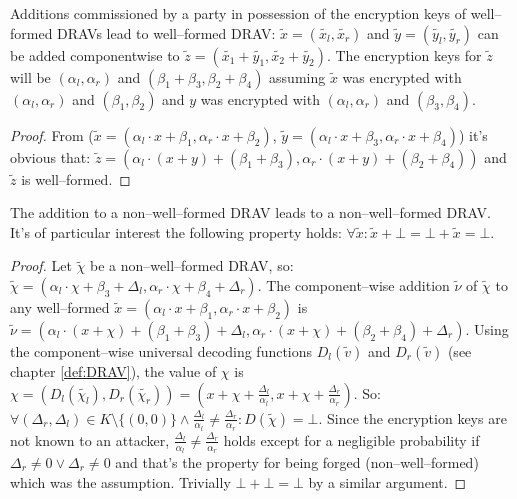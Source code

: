 \begin{lem}
  \label{lem:DRAV-add}

Additions commissioned by a party in possession of the encryption keys of
well--formed DRAVs lead to well--formed DRAV: $\widetilde{x} =
(\widetilde{x_l}, \widetilde{x_r})$ and $\widetilde{y} = (\widetilde{y_l},
\widetilde{y_r})$ can be added componentwise to $\widetilde{z} =
\left(\widetilde{x_1} + \widetilde{y_1}, \widetilde{x_2} +
\widetilde{y_2}\right)$. The encryption keys for $\widetilde{z}$ will be
$(\alpha_l, \alpha_r)$ and $(\beta_1 + \beta_3, \beta_2 + \beta_4)$ assuming
$\widetilde{x}$ was encrypted with $(\alpha_l, \alpha_r)$ and $(\beta_1,
\beta_2)$ and $y$ was encrypted with $(\alpha_l, \alpha_r)$ and $(\beta_3,
\beta_4)$.

\end{lem}
\begin{proof}

From ($\widetilde{x} = \left(\alpha_l \cdot x + \beta_1,
\alpha_r \cdot x + \beta_2\right)$, $\widetilde{y} = \left(\alpha_l \cdot x +
\beta_3, \alpha_r \cdot x + \beta_4\right)$) it's obvious that: $\widetilde{z} =
\left(\alpha_l \cdot (x+y) + (\beta_1 + \beta_3), \alpha_r \cdot (x+y) +
(\beta_2 + \beta_4)\right)$ and $\widetilde{z}$ is well--formed.

\end{proof}

\begin{lem}
  \label{lem:DRAV-add-bad}

The addition to a non--well--formed DRAV leads to a non--well--formed DRAV. It's
of particular interest the following property holds: $\forall \widetilde{x}:
\widetilde{x} + \bot = \bot + \widetilde{x} = \bot$.

\end{lem}
\begin{proof}

Let $\widetilde{\chi}$ be a non--well--formed DRAV, so: $\widetilde{\chi} =
(\alpha_l \cdot \chi + \beta_3 + \Delta_l, \alpha_r \cdot \chi + \beta_4 +
\Delta_r)$. The component--wise addition $\widetilde{\nu}$ of $\widetilde{\chi}$
to any well--formed $\widetilde{x} = (\alpha_l \cdot x + \beta_1, \alpha_r \cdot
x + \beta_2)$ is $\widetilde{\nu} = (\alpha_l \cdot (x+\chi) + (\beta_1+\beta_3)
+ \Delta_l, \alpha_r \cdot (x+\chi) + (\beta_2+\beta_4) + \Delta_r)$.  Using the
component--wise universal decoding functions $D_l(\widetilde{v})$ and
$D_r(\widetilde{v})$ (see chapter \ref{def:DRAV}), the value of $\chi$ is $\chi
= (D_l(\widetilde{\chi_l}), D_r(\widetilde{\chi_r})) = (x + \chi +
\frac{\Delta_l}{\alpha_l}, x + \chi + \frac{\Delta_r}{\alpha_r})$. So: $\forall
(\Delta_r, \Delta_l) \in K \setminus \{(0, 0)\} \wedge \frac{\Delta_l}{\alpha_l}
\neq \frac{\Delta_r}{\alpha_r}: D(\widetilde{\chi}) = \bot$. Since the
encryption keys are not known to an attacker, $\frac{\Delta_l}{\alpha_l} \neq
\frac{\Delta_r}{\alpha_r}$ holds except for a negligible probability if
$\Delta_r \neq 0 \vee \Delta_r \neq 0$ and that's the property for being forged
(non--well--formed) which was the assumption. Trivially $\bot + \bot = \bot$ by
a similar argument.

\end{proof}


